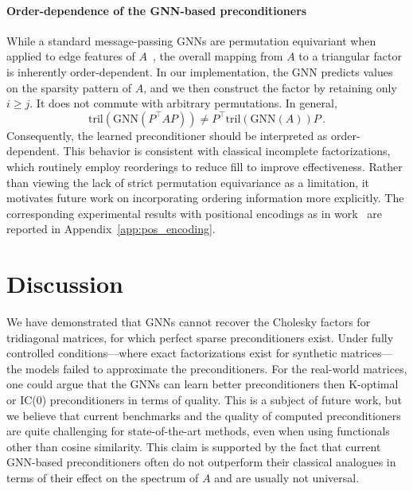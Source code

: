 \documentclass[10pt]{article} %
\theoremstyle{plain}
\theoremstyle{definition}
\theoremstyle{remark}
\begin{document}
\paragraph{Order-dependence of the GNN-based preconditioners}
While a standard message-passing GNNs are permutation equivariant when applied to edge features of $A$~\citep{satorras2021n}, the overall mapping from $A$ to a triangular factor is inherently order-dependent. In our implementation, the GNN predicts values on the sparsity pattern of $A$, and we then construct the factor by retaining only $i \ge j$. It does not commute with arbitrary permutations. In general,
\begin{equation*}
    \mathrm{tril}(\mathrm{GNN}(P^{\top} A P)) \neq P^{\top} \mathrm{tril}(\mathrm{GNN}(A)) P\,.
\end{equation*}
Consequently, the learned preconditioner should be interpreted as order-dependent. This behavior is consistent with classical incomplete factorizations, which routinely employ reorderings to reduce fill to improve effectiveness. Rather than viewing the lack of strict permutation equivariance as a limitation, it motivates future work on incorporating ordering information more explicitly. The corresponding experimental results with positional encodings as in work~\citet{hausner2024learning} are reported in Appendix~\ref{app:pos_encoding}.

\section{Discussion}

We have demonstrated that GNNs cannot recover the Cholesky factors for tridiagonal matrices, for which perfect sparse preconditioners exist. Under fully controlled conditions—where exact factorizations exist for synthetic matrices—the models failed to approximate the preconditioners. For the real-world matrices, one could argue that the GNNs can learn better preconditioners then K-optimal or IC(0) preconditioners in terms of quality. This is a subject of future work, but we believe that current benchmarks and the quality of computed preconditioners are quite challenging for state-of-the-art methods, even when using functionals other than cosine similarity. This claim is supported by the fact that current GNN-based preconditioners often do not outperform their classical analogues in terms of their effect on the spectrum of $A$ and are usually not universal.
\end{document}
